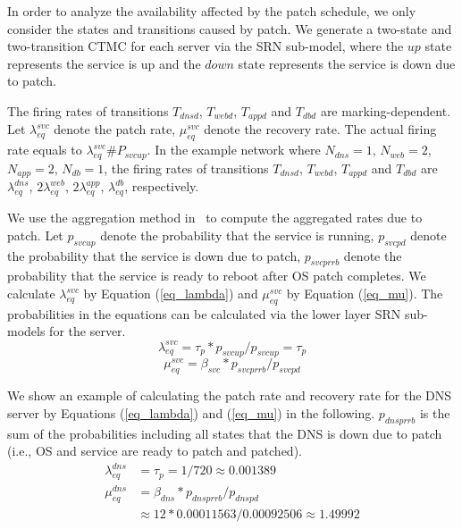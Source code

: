 \documentclass[conference]{IEEEtran}
\begin{document}
In order to analyze the availability affected by the patch schedule, we only consider the states and transitions caused by patch. We generate a two-state and two-transition CTMC for each server via the SRN sub-model, where the $up$ state represents the service is up and the $down$ state represents the service is down due to patch.

The firing rates of transitions $T_{\mathit{dnsd}}$, $T_{\mathit{webd}}$, $T_{\mathit{appd}}$ and $T_{\mathit{dbd}}$ are marking-dependent. Let $\lambda_{\mathit{eq}}^{\mathit{svc}}$ denote the patch rate, $\mu_{\mathit{eq}}^{\mathit{svc}}$ denote the recovery rate. The actual firing rate equals to $\lambda_{\mathit{eq}}^{\mathit{svc}}$\#${P_{\mathit{svcup}}}$. In the example network where $N_{\mathit{dns}}=1$, $N_{\mathit{web}}=2$,  $N_{\mathit{app}}=2$, $N_{\mathit{db}}=1$, the firing rates of transitions $T_{\mathit{dnsd}}$, $T_{\mathit{webd}}$, $T_{\mathit{appd}}$ and $T_{\mathit{dbd}}$ are $\lambda_{\mathit{eq}}^{\mathit{dns}}$, $2\lambda_{\mathit{eq}}^{\mathit{web}}$, $2\lambda_{\mathit{eq}}^{\mathit{app}}$, $\lambda_{\mathit{eq}}^{\mathit{db}}$, respectively.

We use the aggregation method in~\cite{Trivedi2013ASMBI} to compute the aggregated rates due to patch. Let $p_{\mathit{svcup}}$ denote the probability that the service is running, $p_{\mathit{svcpd}}$ denote the probability that the service is down due to patch, $p_{\mathit{svcprrb}}$ denote the probability that the service is ready to reboot after OS patch completes. We calculate $\lambda_{\mathit{eq}}^{\mathit{svc}}$ by Equation (\ref{eq_lambda}) and $\mu_{\mathit{eq}}^{\mathit{svc}}$ by Equation (\ref{eq_mu}). The probabilities in the equations can be calculated via the lower layer SRN sub-models for the server.
\begin{equation} \label{eq_lambda}
\lambda^{\mathit{svc}}_{\mathit{eq}}=\tau_{p}*p_{\mathit{svcup}}/p_{\mathit{svcup}}=\tau_{p}
\end{equation}
\begin{equation} \label{eq_mu}
\mu_{\mathit{eq}}^{\mathit{svc}}=\beta_{svc}*p_{\mathit{svcprrb}}/p_{\mathit{svcpd}}
\end{equation}

We show an example of calculating the patch rate and recovery rate for the DNS server by Equations (\ref{eq_lambda}) and (\ref{eq_mu}) in the following. $p_{\mathit{dnsprrb}}$ is the sum of the probabilities including all states that the DNS is down due to patch (i.e., OS and service are ready to patch and patched).
\begin{align*} 
\lambda^{\mathit{dns}}_{\mathit{eq}}&=\tau_{p}=1/720 \approx 0.001389\\
\mu_{\mathit{eq}}^{\mathit{dns}}&=\beta_{dns}*p_{\mathit{dnsprrb}}/p_{\mathit{dnspd}}\\
& \approx 12*0.00011563/0.00092506 \approx 1.49992
\end{align*}
\end{document}
